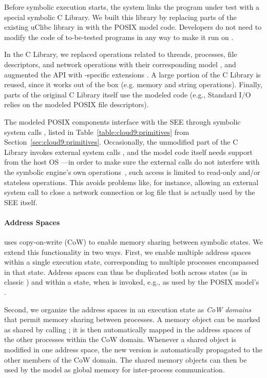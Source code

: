 Before symbolic execution starts, the \cnine system links the program under test with a special symbolic C Library.
%
We built this library by replacing parts of the existing uClibc library in \klee with the POSIX model code.  Developers do not need to modify the code of to-be-tested programs in any way to make it run on \cnine.  

In the C Library, we replaced operations related to threads, processes, file descriptors, and network operations with their corresponding model \cI, and augmented the API with \cnine-specific extensions \cII.
%
A large portion of the C Library is reused, since it works out of the box \cIII (e.g. memory and string operations).  Finally, parts of the original C Library itself use  the modeled code \cIV (e.g., Standard I/O  relies on the modeled POSIX file descriptors).

The modeled POSIX components interface with the SEE through symbolic system calls \cV, listed in Table~\ref{table:cloud9:primitives} from Section~\ref{sec:cloud9:primitives}.
%
Occasionally, the unmodified part of the C Library invokes external system calls \cVI, and the model code itself needs support from the host OS \cVII---in order to make sure the external calls do not interfere with the symbolic engine's own operations~\cVIII, such access is limited to read-only and/or stateless operations.  This avoids problems like, for instance, allowing an external  system call to close a network connection or log file that is actually used by the SEE itself.

\paragraph{Address Spaces}

\klee uses copy-on-write (CoW) to enable memory sharing between symbolic states.
%
We extend this functionality in two ways.  First, we enable multiple address spaces within a single execution state, corresponding to multiple processes encompassed in that state. Address spaces can thus be duplicated both across states (as in classic \klee) and within a state, when  is invoked, e.g., as used by the POSIX model's .

Second, we organize the address spaces in an execution state as \emph{CoW domains} that permit memory sharing between processes.
%
A memory object can be marked as shared by calling ; it is then automatically mapped in the address spaces of the other processes within the CoW domain.  Whenever a shared object is modified in one address space, the new version is automatically propagated to the other members of the CoW domain.  The shared memory objects can then be used by the model as global memory for inter-process communication.

